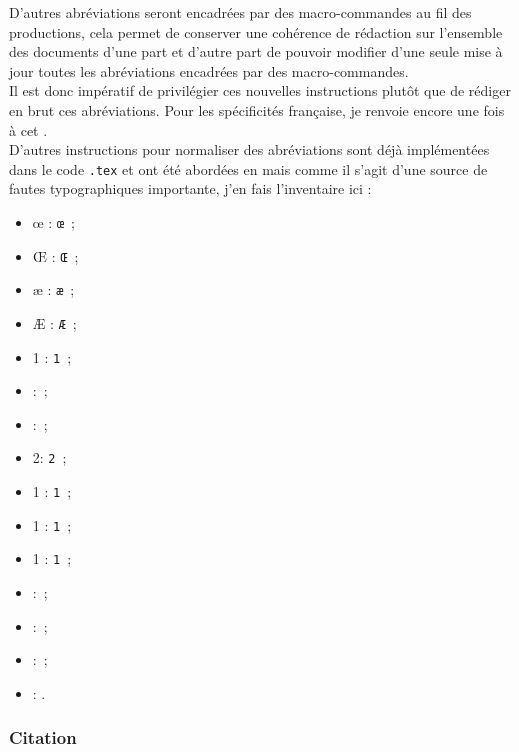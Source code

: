 \documentclass[a4paper, 11pt, twoside, fleqn]{memoir}
\begin{document}
D'autres abréviations seront encadrées par des macro-commandes au fil des productions, cela permet de conserver une cohérence de rédaction sur l'ensemble des documents d'une part et d'autre part de pouvoir modifier d'une seule mise à jour toutes les abréviations encadrées par des macro-commandes.\\
Il est donc impératif de privilégier ces nouvelles instructions plutôt que de rédiger \og en brut \fg{} ces abréviations. Pour les spécificités française,  je renvoie encore une fois à cet .\\

D'autres instructions pour normaliser des abréviations sont déjà implémentées dans le code \texttt{.tex} et ont été abordées en  mais comme il s'agit d'une source de fautes typographiques importante, j'en fais l'inventaire ici :

\begin{multicols}{2}
\begin{itemize}
\item \oe{} : \texttt{\oe{}} \,;
\item \OE{} : \texttt{\OE{}} \,;
\item \ae{} : \texttt{\ae{}} \,;
\item \AE{} : \texttt{\AE{}} \,;
\item 1\ier{} : \texttt{1\ier{}} \,;
\item \no{} : \texttt{\no{}} \,;
\item \No{} : \texttt{\No{}} \,;
\item 2\ieme{}: \texttt{2\ieme{}} \,;
\item 1\iers{} : \texttt{1\iers{}} \,;
\item 1\iere{} : \texttt{1\iere{}} \,;
\item 1\ieres{} : \texttt{1\ieres{}} \,;
\item \primo{} : \texttt{\primo{}} \,;
\item \secundo{} : \texttt{\secundo{}} \,;
\item \tertio{} : \texttt{\tertio{}} \,;
\item \quarto{} : \texttt{\quarto{}} .
\end{itemize}
\end{multicols}

	\subsubsection{Citation}
\end{document}
